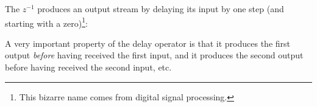 The  $z^{-1}$ produces an output stream by
delaying its input by one step (and starting with a
zero)\footnote{This bizarre name comes from digital signal
processing.}:
%
\begin{center}
\end{center}
\vspace{-1ex}
%
A very important property of the delay operator is that it produces
the first output \emph{before} having received the first input, and it
produces the second output before having received the second input,
etc.

